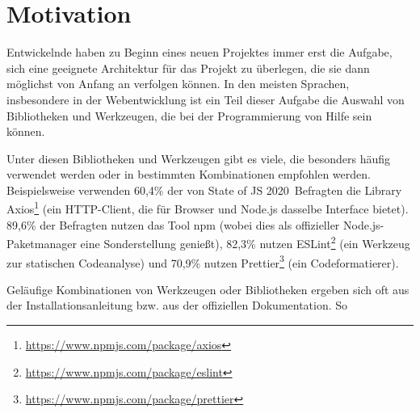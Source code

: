 \section{Motivation}
Entwickelnde haben zu Beginn eines neuen Projektes immer erst die Aufgabe, sich eine geeignete Architektur für das Projekt zu überlegen, die sie dann möglichst von Anfang an verfolgen können. In den meisten Sprachen, insbesondere in der Webentwicklung ist ein Teil dieser Aufgabe die Auswahl von Bibliotheken und Werkzeugen, die bei der Programmierung von Hilfe sein können.

Unter diesen Bibliotheken und Werkzeugen gibt es viele, die besonders häufig verwendet werden oder in bestimmten Kombinationen empfohlen werden. Beispielsweise verwenden 60,4\% der von \glqq State of JS 2020\grqq\ Befragten die Library Axios\footnote{\url{https://www.npmjs.com/package/axios}} (ein HTTP-Client, die für Browser und Node.js dasselbe Interface bietet)\cite{stateofjs}. 89,6\% der Befragten nutzen das Tool \gls{npm} (wobei dies als offizieller Node.js-Paketmanager eine Sonderstellung genießt), 82,3\% nutzen ESLint\footnote{\url{https://www.npmjs.com/package/eslint}} (ein Werkzeug zur statischen Codeanalyse) und 70,9\% nutzen Prettier\footnote{\url{https://www.npmjs.com/package/prettier}} (ein Codeformatierer).

Geläufige Kombinationen von Werkzeugen oder Bibliotheken ergeben sich oft aus der Installationsanleitung bzw. aus der offiziellen Dokumentation. So 